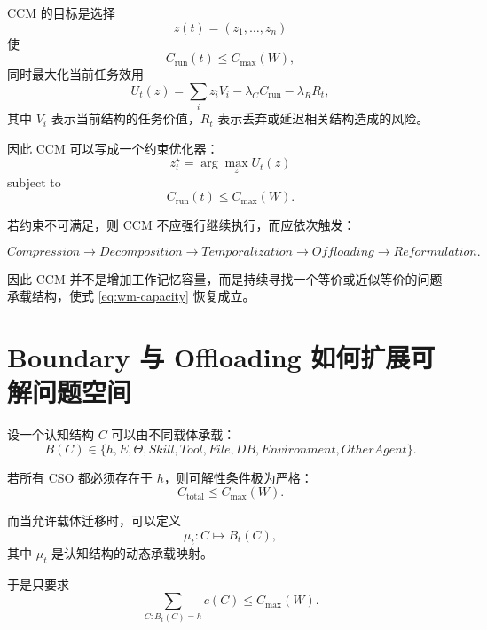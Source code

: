 CCM 的目标是选择
\begin{equation}
z(t)
=
(z_1,\ldots,z_n)
\end{equation}
使
\begin{equation}
C_{\mathrm{run}}(t)
\leq
C_{\max}(W),
\end{equation}
同时最大化当前任务效用
\begin{equation}
U_t(z)
=
\sum_i
z_i
V_i
-
\lambda_C C_{\mathrm{run}}
-
\lambda_R R_t,
\end{equation}
其中 $V_i$ 表示当前结构的任务价值，$R_t$ 表示丢弃或延迟相关结构造成的风险。

因此 CCM 可以写成一个约束优化器：
\begin{equation}
z^\star_t
=
\arg\max_z
U_t(z)
\end{equation}
subject to
\begin{equation}
C_{\mathrm{run}}(t)
\leq
C_{\max}(W).
\end{equation}

若约束不可满足，则 CCM 不应强行继续执行，而应依次触发：

\begin{equation}
Compression
\rightarrow
Decomposition
\rightarrow
Temporalization
\rightarrow
Offloading
\rightarrow
Reformulation.
\end{equation}

因此 CCM 并不是增加工作记忆容量，而是持续寻找一个等价或近似等价的问题承载结构，使式 \eqref{eq:wm-capacity} 恢复成立。

\section{Boundary 与 Offloading 如何扩展可解问题空间}

设一个认知结构 $C$ 可以由不同载体承载：
\begin{equation}
B(C)
\in
\{
h,
E,
\Theta,
Skill,
Tool,
File,
DB,
Environment,
OtherAgent
\}.
\end{equation}

若所有 CSO 都必须存在于 $h$，则可解性条件极为严格：
\begin{equation}
C_{\mathrm{total}}
\leq
C_{\max}(W).
\end{equation}

而当允许载体迁移时，可以定义
\begin{equation}
\mu_t:
C
\mapsto
B_t(C),
\end{equation}
其中 $\mu_t$ 是认知结构的动态承载映射。

于是只要求
\begin{equation}
\sum_{C:B_t(C)=h}
c(C)
\leq
C_{\max}(W).
\end{equation}

